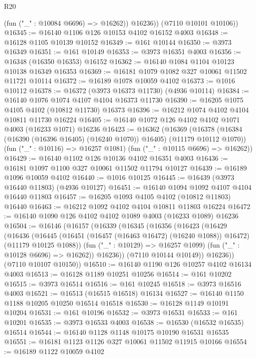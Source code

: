 \begin{lexlean}{R20}
\begin{coremodule}
            (fun ("_" : @10084 @6696) => @16262))
          @16236))
      (@7110 @10101 @10106))
@16345 := @16140 @1106 @126 @10153 @4102 @16152 @4003
@16348 := @16128 @1105 @10139 @10152
@16349 := @161 @10144
@16350 := @3973 @16349
@16351 := @161 @10149
@16353 := @3973 @16351 @4003
@16356 := @16348 (@16350 @16353) @16152
@16362 := @16140 @1084 @1104 @10123 @10138 @16349 @16353
@16369 := @16181 @1079 @1082 @327 @10061 @11502 @11721 @10114
@16372 := @16189 @1078 @10059 @4102
@16373 := @1016 @10112
@16378 := @16372 (@3973 @16373 @11730) (@4936 @10114)
@16384 := @16140 @1076 @1074 @4107 @4104 @16373 @11730
@16390 := @16205 @1075 @4105 @4102 (@10812 @11730) @16373
@16396 := @16212 @1074 @4102 @4104 @10811 @11730 @16224
@16405 := @16140 @1072 @126 @4102 @4102 @1071 @4003 (@16233 @1071) @16236
@16423 := @16362
    (@16369
      (@16378 (@16384 (@16390 (@16396 @16405) (@16240 @1070)) @16405) (@11179 @10112 @1070))
      (fun ("_" : @10116) => @16257 @1081)
      (fun ("_" : @10115 @6696) => @16262))
@16429 := @16140 @1102 @126 @10136 @4102 @16351 @4003
@16436 := @16181 @1097 @1100 @327 @10061 @11502 @11794 @10127
@16439 := @16189 @1096 @10059 @4102
@16440 := @1016 @10125
@16445 := @16439 (@3973 @16440 @11803) (@4936 @10127)
@16451 := @16140 @1094 @1092 @4107 @4104 @16440 @11803
@16457 := @16205 @1093 @4105 @4102 (@10812 @11803) @16440
@16463 := @16212 @1092 @4102 @4104 @10811 @11803 @16224
@16472 := @16140 @1090 @126 @4102 @4102 @1089 @4003 (@16233 @1089) @16236
@16504 := @16146
    (@16157
      (@16339
        (@16345
          (@16356
            (@16423
              (@16429
                (@16436
                  (@16445
                    (@16451 (@16457 (@16463 @16472) (@16240 @1088)) @16472)
                    (@11179 @10125 @1088))
                  (fun ("_" : @10129) => @16257 @1099)
                  (fun ("_" : @10128 @6696) => @16262))
                @16236))
            (@7110 @10144 @10149))
          @16236))
      (@7110 @10107 @10150))
@16510 := @16140 @1190 @126 @10257 @4102 @16134 @4003
@16513 := @16128 @1189 @10251 @10256
@16514 := @161 @10202
@16515 := @3973 @16514
@16516 := @161 @10245
@16518 := @3973 @16516 @4003
@16521 := @16513 (@16515 @16518) @16134
@16527 := @16140 @1150 @1188 @10205 @10250 @16514 @16518
@16530 := @16128 @1149 @10191 @10204
@16531 := @161 @10196
@16532 := @3973 @16531
@16533 := @161 @10201
@16535 := @3973 @16533 @4003
@16538 := @16530 (@16532 @16535) @16514
@16544 := @16140 @1128 @1148 @10175 @10190 @16531 @16535
@16551 := @16181 @1123 @1126 @327 @10061 @11502 @11915 @10166
@16554 := @16189 @1122 @10059 @4102

\end{coremodule}
\end{lexlean}
